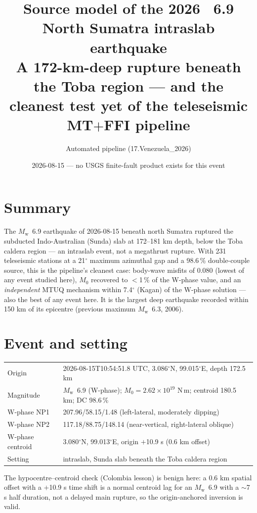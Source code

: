 \documentclass[11pt]{article}
\title{\textbf{Source model of the 2026 \Mw~6.9 North Sumatra intraslab earthquake}\\
\large A 172-km-deep rupture beneath the Toba region --- and the cleanest test yet of the
teleseismic MT$+$FFI pipeline}
\author{Automated pipeline (17.Venezuela\_2026)}
\date{2026-08-15 --- no USGS finite-fault product exists for this event}
\newcommand{\Mw}{$M_{\mathrm w}$}
\begin{document}
\maketitle

\section*{Summary}
The \Mw~6.9 earthquake of 2026-08-15 beneath north Sumatra ruptured the subducted
Indo-Australian (Sunda) slab at 172--181 km depth, below the Toba caldera region --- an
intraslab event, not a megathrust rupture. With 231 teleseismic stations at a 21$^\circ$
maximum azimuthal gap and a 98.6\,\% double-couple source, this is the pipeline's cleanest
case: body-wave misfits of 0.080 (lowest of any event studied here), $M_0$ recovered to
$<$1\,\% of the W-phase value, and an \emph{independent} MTUQ mechanism within 7.4$^\circ$
(Kagan) of the W-phase solution --- also the best of any event here. It is the largest deep
earthquake recorded within 150 km of its epicentre (previous maximum \Mw~6.3, 2006).

\section{Event and setting}
\begin{table}[H]\centering\small
\begin{tabular}{ll}
\toprule
Origin & 2026-08-15T10:54:51.8 UTC, 3.086$^\circ$N, 99.015$^\circ$E, depth 172.5 km \\
Magnitude & \Mw~6.9 (W-phase); $M_0=2.62\times10^{19}$ N\,m; centroid 180.5 km; DC 98.6\,\% \\
W-phase NP1 & 207.96/58.15/1.48 \quad (left-lateral, moderately dipping) \\
W-phase NP2 & 117.18/88.75/148.14 \quad (near-vertical, right-lateral oblique) \\
W-phase centroid & 3.080$^\circ$N, 99.013$^\circ$E, origin $+$10.9 s (0.6 km offset) \\
Setting & intraslab, Sunda slab beneath the Toba caldera region \\
\bottomrule
\end{tabular}
\end{table}

The hypocentre--centroid check (Colombia lesson) is benign here: a 0.6 km spatial offset with a
$+$10.9 s time shift is a normal centroid lag for an \Mw~6.9 with a $\sim$7 s half duration,
not a delayed main rupture, so the origin-anchored inversion is valid.
\end{document}
